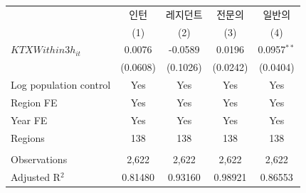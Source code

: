 \begingroup
\centering
\begin{tabular}{lcccc}
   \toprule
                          & 인턴     & 레지던트 & 전문의   & 일반의 \\   
                          & (1)      & (2)      & (3)      & (4)\\  
   \midrule 
   $KTXWithin3h_{it}$     & 0.0076   & -0.0589  & 0.0196   & 0.0957$^{**}$\\   
                          & (0.0608) & (0.1026) & (0.0242) & (0.0404)\\   
   Log population control & Yes      & Yes      & Yes      & Yes\\  
   Region FE              & Yes      & Yes      & Yes      & Yes\\  
   Year FE                & Yes      & Yes      & Yes      & Yes\\  
   Regions                & 138      & 138      & 138      & 138\\  
    \\
   Observations           & 2,622    & 2,622    & 2,622    & 2,622\\  
   Adjusted R$^2$         & 0.81480  & 0.93160  & 0.98921  & 0.86553\\  
   \bottomrule
\end{tabular}
\par\endgroup

